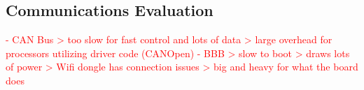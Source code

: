 


\subsection{Communications Evaluation}
\textcolor{red}{
 - CAN Bus 
   > too slow for fast control and lots of data
   > large overhead for processors utilizing driver code (CANOpen)
 - BBB
   > slow to boot
   > draws lots of power
   > Wifi dongle has connection issues
   > big and heavy for what the board does
}

